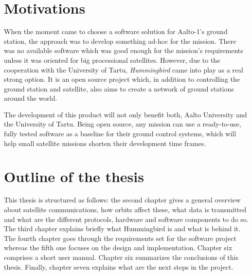 \section{Motivations}

When the moment came to choose a software solution for Aalto-1's ground station, the approach was to develop something ad-hoc for the mission. There was no available software which was good enough for the mission's requirements unless it was oriented for big processional satellites. However, due to the cooperation with the University of Tartu, \emph{Hummingbird} came into play as a real strong option. It is an open source project which, in addition to controlling the ground station and satellite, also aims to create a network of ground stations around the world. 

The development of this product will not only benefit both, Aalto University and the University of Tartu. Being open source, any mission can use a ready-to-use, fully tested software as a baseline for their ground control systems, which will help small satellite missions shorten their development time frames. 

\pagebreak
\section{Outline of the thesis}
This thesis is structured as follows: the second chapter gives a general overview about satellite communications, how orbits affect these, what data is transmitted and what are the different protocols, hardware and software components to do so. The third chapter explains briefly what Hummingbird is and what is behind it. The fourth chapter goes through the requirements set for the software project whereas the fifth one focuses on the design and implementation. Chapter six comprises a short user manual. Chapter six summarizes the conclusions of this thesis. Finally, chapter seven explains what are the next steps in the project.

\newpage
